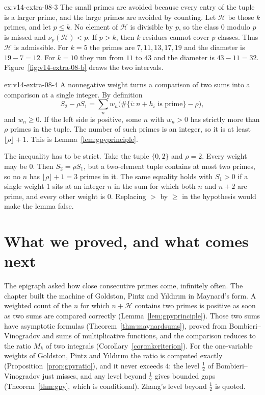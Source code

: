 \begin{solution}{ex:v14-extra-08-3}
\idea The small primes are avoided because every entry of the tuple is a larger prime, and the large primes are avoided by counting.
\writeup Let $\mathcal H$ be those $k$ primes, and let $p\le k$. No element of $\mathcal H$ is divisible by $p$, so the class $0$ modulo $p$ is missed and $\nu_p(\mathcal H)<p$. If $p>k$, then $k$ residues cannot cover $p$ classes. Thus $\mathcal H$ is admissible. For $k=5$ the primes are $7,11,13,17,19$ and the diameter is $19-7=12$. For $k=10$ they run from $11$ to $43$ and the diameter is $43-11=32$. Figure~\ref{fig:v14-extra-08-b} draws the two intervals.
\end{solution}

\begin{solution}{ex:v14-extra-08-4}
\idea A nonnegative weight turns a comparison of two sums into a comparison at a single integer.
\writeup By definition
\[
S_2-\rho S_1=\sum_n w_n\bigl(\#\{i:n+h_i\text{ is prime}\}-\rho\bigr),
\]
and $w_n\ge0$. If the left side is positive, some $n$ with $w_n>0$ has strictly more than $\rho$ primes in the tuple. The number of such primes is an integer, so it is at least $\lfloor\rho\rfloor+1$. This is Lemma~\ref{lem:gpyprinciple}.

The inequality has to be strict. Take the tuple $\{0,2\}$ and $\rho=2$. Every weight may be $0$. Then $S_2=\rho S_1$, but a two-element tuple contains at most two primes, so no $n$ has $\lfloor\rho\rfloor+1=3$ primes in it. The same equality holds with $S_1>0$ if a single weight $1$ sits at an integer $n$ in the sum for which both $n$ and $n+2$ are prime, and every other weight is $0$. Replacing $>$ by $\ge$ in the hypothesis would make the lemma false.
\end{solution}

\section{What we proved, and what comes next}

The epigraph asked how close consecutive primes come, infinitely often. The chapter built the machine of Goldston, Pintz and Yıldırım in Maynard's form. A weighted count of the $n$ for which $n+\mathcal H$ contains two primes is positive as soon as two sums are compared correctly (Lemma~\ref{lem:gpyprinciple}). Those two sums have asymptotic formulas (Theorem~\ref{thm:maynardsums}), proved from Bombieri--Vinogradov and sums of multiplicative functions, and the comparison reduces to the ratio $M_k$ of two integrals (Corollary~\ref{cor:mkcriterion}). For the one-variable weights of Goldston, Pintz and Yıldırım the ratio is computed exactly (Proposition~\ref{prop:gpyratio}), and it never exceeds $4$: the level $\frac12$ of Bombieri--Vinogradov just misses, and any level beyond $\frac12$ gives bounded gaps (Theorem~\ref{thm:gpy}, which is conditional). Zhang's level beyond $\frac12$ is quoted.

